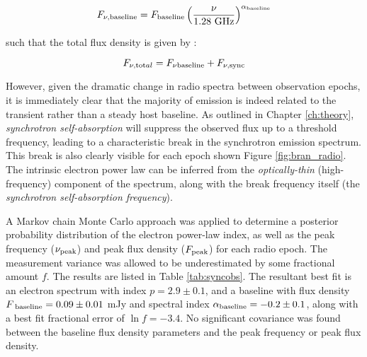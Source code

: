 \begin{equation}\label{eq:Fhost}
F_{\nu, \textup{baseline}} = F_{ \textup{baseline}} \left(\frac{\nu}{1.28 \textup{ GHz}}\right)^{\alpha_{ \textup{baseline}}}
\end{equation}

such that the total flux density is given by :

\begin{equation}\label{eq:Ftotal}
F_{\nu,  \textup{tot}al} = F_{\nu \textup{baseline}} + F_{\nu,  \textup{sync}} 
\end{equation}

However, given the dramatic change in radio spectra between observation epochs, it is immediately clear that the majority of emission is indeed related to the transient rather than a steady host baseline. As outlined in Chapter \ref{ch:theory}, \emph{synchrotron self-absorption} will suppress the observed flux up to a threshold frequency, leading to a characteristic break in the synchrotron emission spectrum. This break is also clearly visible for each epoch shown Figure \ref{fig:bran_radio}. The intrinsic electron power law can be inferred from the \emph{optically-thin} (high-frequency) component of the spectrum, along with the break frequency itself (the \emph{synchrotron self-absorption frequency}).

%

%

A Markov chain Monte Carlo approach  was applied to determine a posterior probability distribution of the electron power-law index, as well as the peak frequency ($\nu_{ \textup{peak}}$) and peak flux density ($F_{ \textup{peak}}$) for each radio epoch. The measurement variance was allowed to be underestimated by some fractional amount $f$. The results are listed in Table \ref{tab:syncobs}. The resultant best fit is an electron spectrum with index $p = 2.9 \pm 0.1$, and a baseline with flux density $F_{\textup{ baseline}}=0.09\pm 0.01$ mJy and spectral index $\alpha_{\textup{baseline}} = -0.2\pm 0.1$, along with a best fit fractional error of $\ln f=-3.4$. No significant covariance was found between the baseline flux density parameters and the peak frequency or peak flux density. 

